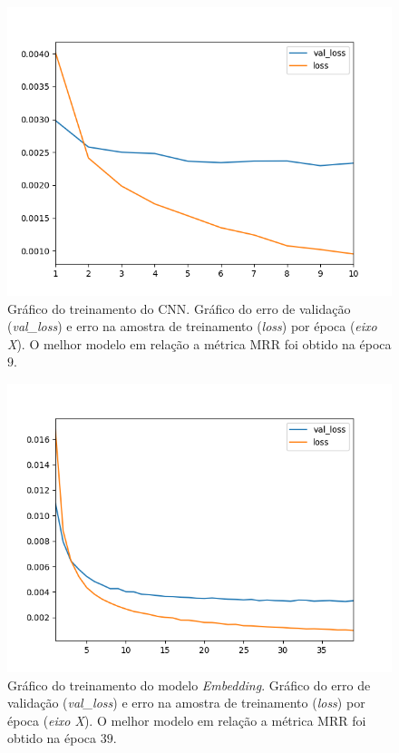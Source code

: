 \begin{figure}[h]
    \centering
    \includegraphics[width=1\textwidth]{figuras/cap-resultados-preliminares/569229_ConvolutionModel_plot.png}
    \caption{Gráfico do treinamento do CNN. Gráfico do erro de validação (\emph{val\_loss}) e erro na amostra de treinamento (\emph{loss}) por época (\emph{eixo X}). O melhor modelo em relação a métrica MRR foi obtido na época $9$.}
    \label{fig:grafico-erro-cnn}
\end{figure}

\begin{figure}[h]
    \centering
    \includegraphics[width=1\textwidth]{figuras/cap-resultados-preliminares/569229_EmbeddingModel_plot.png}
    \caption{Gráfico do treinamento do modelo \textit{Embedding}. Gráfico do erro de validação (\emph{val\_loss}) e erro na amostra de treinamento (\emph{loss}) por época (\emph{eixo X}). O melhor modelo em relação a métrica MRR foi obtido na época $39$.}
    \label{fig:grafico-embedding}
\end{figure}

